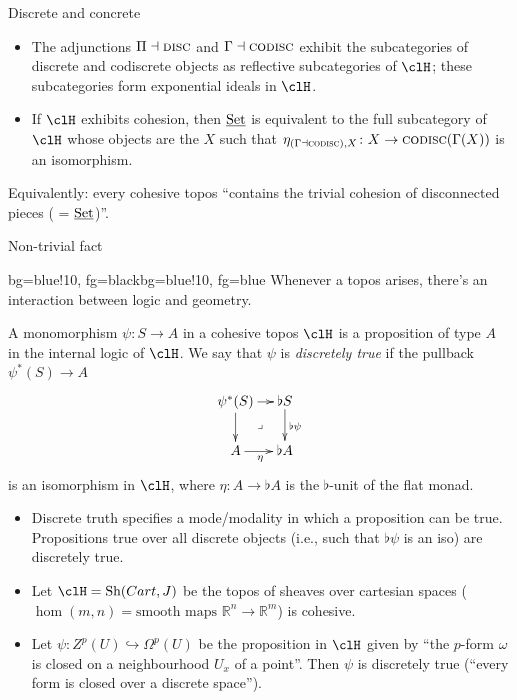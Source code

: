 \documentclass[presentation]{beamer}
\begin{document}
\begin{frame}{Discrete and concrete}
\begin{prop}
  \begin{itemize}
\item The adjunctions $\Pi\dashv\textsc{disc}$ and $\Gamma\dashv\textsc{codisc}$ exhibit the subcategories of discrete and codiscrete objects as reflective subcategories of $\clH$; these subcategories form \alert{exponential ideals} in $\clH$.
\item If $\clH$ exhibits cohesion, then $\underline{\text{Set}}$ is equivalent to the full subcategory of $\clH$ whose objects are the $X$ such that $\eta_{(\Gamma\dashv\textsc{codisc}),X}\colon X\to \textsc{codisc}(\Gamma(X))$ is an isomorphism.
\end{itemize}
\end{prop}
Equivalently: every cohesive topos ``contains the trivial cohesion of disconnected pieces ( = $\underline{\text{Set}}$)''.
\end{frame}
%
%
%
%
%
%
%
%
%
\begin{frame}{Non-trivial fact}
\begin{variableblock}{}{bg=blue!10, fg=black}{bg=blue!10, fg=blue}
Whenever a topos arises, there's an interaction between logic and geometry.
\end{variableblock}
\onslide<+->
\small
\begin{df}
A monomorphism $\psi\colon S\to A$ in a cohesive topos $\clH$ is a proposition of type $A$ in the internal logic of $\clH$. We say that $\psi$ is \emph{discretely true} if the pullback $\psi^*(S) \to A$
\[
\xymatrix@!=4mm{
	\psi^*(S) \ar[r]\ar[d]\ar@{}[dr]|\lrcorner & \flat S \ar[d]^{\flat\psi} \\
	A \ar[r]_\eta & \flat A
}
\]
is an isomorphism in $\clH$, where $\eta : A\to \flat A$ is the $\flat$-unit of the flat monad.
\end{df}
\end{frame}
\begin{frame}
\begin{itemize}
  \item<+-> Discrete truth specifies a \alert{mode/modality} in which a proposition can be true. Propositions true over all discrete objects (i.e., such that $\flat\psi$ is an iso) are discretely true.
  \item<+-> Let $\clH = \text{Sh}(Cart,J)$ be the topos of sheaves over cartesian spaces ($\hom(m,n) = \text{smooth maps }\mathbb{R}^n\to \mathbb{R}^m$) is cohesive. \item<+-> Let $\psi\colon Z^p(U) \hookrightarrow \Omega^p(U)$ be the proposition in $\clH$ given by ``the $p$-form $\omega$ is closed on a neighbourhood $U_x$ of a point''. Then $\psi$ is discretely true (``every form is closed over a discrete space'').
\end{itemize}
\end{frame}
\end{document}
